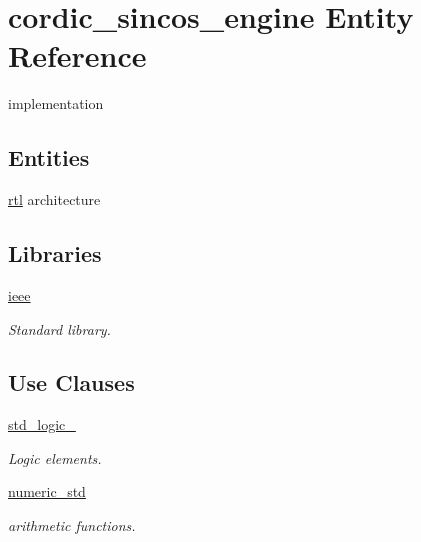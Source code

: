 \hypertarget{classcordic__sincos__engine}{}\section{cordic\+\_\+sincos\+\_\+engine Entity Reference}
\label{classcordic__sincos__engine}


implementation  


\subsection*{Entities}
\begin{DoxyCompactItemize}
\item 
\hyperlink{classcordic__sincos__engine_1_1rtl}{rtl} architecture
\end{DoxyCompactItemize}
\subsection*{Libraries}
 \begin{DoxyCompactItemize}
\item 
\mbox{\label{classcordic__sincos__engine_a0a6af6eef40212dbaf130d57ce711256}} 
\hyperlink{classcordic__sincos__engine_a0a6af6eef40212dbaf130d57ce711256}{ieee} 
\begin{DoxyCompactList}\small\item\em Standard library. \end{DoxyCompactList}\end{DoxyCompactItemize}
\subsection*{Use Clauses}
 \begin{DoxyCompactItemize}
\item 
\mbox{\label{classcordic__sincos__engine_acd03516902501cd1c7296a98e22c6fcb}} 
\hyperlink{classcordic__sincos__engine_acd03516902501cd1c7296a98e22c6fcb}{std\+\_\+logic\+\_}   
\begin{DoxyCompactList}\small\item\em Logic elements. \end{DoxyCompactList}\item 
\mbox{\label{classcordic__sincos__engine_a2edc34402b573437d5f25fa90ba4013e}} 
\hyperlink{classcordic__sincos__engine_a2edc34402b573437d5f25fa90ba4013e}{numeric\+\_\+std}   
\begin{DoxyCompactList}\small\item\em arithmetic functions. \end{DoxyCompactList}\end{DoxyCompactItemize}
